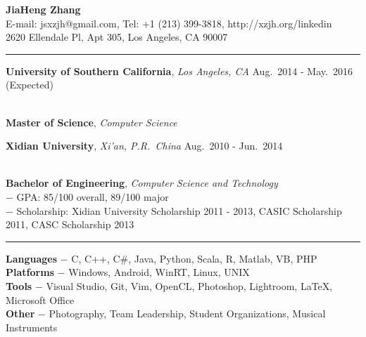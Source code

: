 \documentclass[a4paper,10pt]{article}
\newcommand{\shadedsection}[1]{
    \setlength{\fboxsep}{0pt}
    \colorbox{shadecolor}{%
        \begin{minipage}{\linewidth}%
            \vspace{0.2em}%
            #1%
        \end{minipage}%
    }
}
\newenvironment{rSection}[1]{ %
  \medskip
  \hspace{-1.5em}{\color{Blue}\MakeUppercase{\large \bf {#1}}} %
  \vspace{-0.2em}
  \medskip
  \hrule %
  \begin{list}{}{ %
    \setlength{\leftmargin}{1.5em} %
  }
\setlength{\itemsep}{1pt}
  \item[]
}{
  \end{list}
}
\newcommand{\detail}[1]{{$-$ {#1}}}
\newcommand{\period}[3]{\normalsize {#1} \hfill {#2} - {#3}}
\newcommand{\skill}[2]{{\bf #1} \detail{{#2}}}
\begin{document}
\begin{center}
  {\huge \bf \color{Blue} JiaHeng Zhang}\\
  \medskip
  {E-mail: jsxzjh@gmail.com, Tel: +1 (213) 399-3818, http://xzjh.org/linkedin}\\
  \smallskip
  {2620 Ellendale Pl, Apt 305, Los Angeles, CA 90007}
\end{center}

\begin{rSection}{Education}
  \vspace{-1.5em}
  \item
    \shadedsection{\period{{\bf University of Southern California}, {\em Los Angeles, CA}}{Aug.~2014}{May.~2016 (Expected)}}\\
    {\bf Master of Science}, {\em Computer Science}
  \item
    \shadedsection{\period{{\bf Xidian University}, {\em Xi'an, P.R.~China}}{Aug.~2010}{Jun.~2014}}\\
    {\bf Bachelor of Engineering}, {\em Computer Science and Technology}\\
    \detail{GPA: 85/100 overall, 89/100 major}\\
    \detail{Scholarship: Xidian University Scholarship 2011 - 2013, CASIC Scholarship 2011, CASC Scholarship 2013}
\end{rSection}

\vspace{-0.5em}

\begin{rSection}{Skills}
  \vspace{-1.5em}
  \item
\skill{Languages}{C, C++, C\#, Java, Python, Scala, R, Matlab, VB, PHP}\\
\skill{Platforms}{Windows, Android, WinRT, Linux, UNIX}\\
\skill{Tools}{Visual Studio, Git, Vim, OpenCL, Photoshop, Lightroom, \LaTeX, Microsoft Office}\\
\skill{Other}{Photography, Team Leadership, Student Organizations, Musical Instruments}
\end{rSection}

\vspace{-0.5em}
\end{document}
